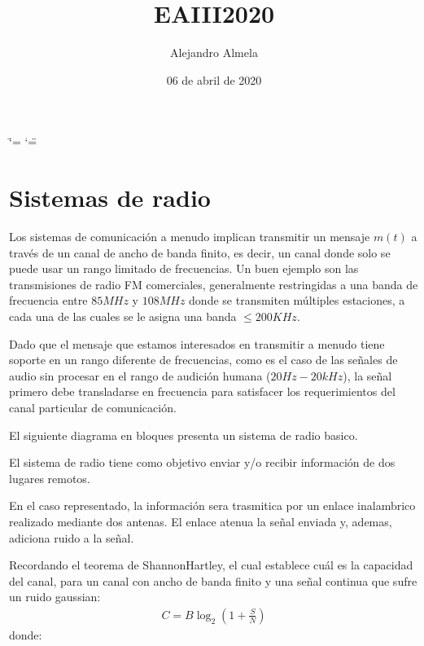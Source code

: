 \documentclass[letterpaper,10pt,spanish]{sphinxmanual}
\title{EAIII2020}
\date{06 de abril de 2020}
\author{Alejandro Almela}
\let\sphinxpxdimen\pdfpxdimen\else\newdimen\sphinxpxdimen
\begin{document}
\ifdefined\shorthandoff
  \ifnum\catcode`\=\string=\active\shorthandoff{=}\fi
  \ifnum\catcode`\"=\active{}\fi
\fi

\pagestyle{empty}
\sphinxmaketitle
\pagestyle{plain}
\sphinxtableofcontents
\pagestyle{normal}
\label{\detokenize{index::doc}}



\chapter{Sistemas de radio}
\label{\detokenize{introduccion/sistemas:Sistemas-de-radio}}\label{\detokenize{introduccion/sistemas::doc}}
Los sistemas de comunicación a menudo implican transmitir un mensaje \(m(t)\) a través de un canal de ancho de banda finito, es decir, un canal donde solo se puede usar un rango limitado de frecuencias. Un buen ejemplo son las transmisiones de radio FM comerciales, generalmente restringidas a una banda de frecuencia entre \(85MHz\) y \(108MHz\) donde se transmiten múltiples estaciones, a cada una de las cuales se le asigna una banda \(\le 200 KHz\).

Dado que el mensaje que estamos interesados en transmitir a menudo tiene soporte en un rango diferente de frecuencias, como es el caso de las señales de audio sin procesar en el rango de audición humana (\(20 Hz - 20 kHz\)), la señal primero debe transladarse en frecuencia para satisfacer los requerimientos del canal particular de comunicación.

El siguiente diagrama en bloques presenta un sistema de radio basico.

\sphinxincludegraphics[width=731\sphinxpxdimen,height=276\sphinxpxdimen]{{radio1}.png}

El sistema de radio tiene como objetivo enviar y/o recibir información de dos lugares remotos.

En el caso representado, la información sera trasmitica por un enlace inalambrico realizado mediante dos antenas. El enlace atenua la señal enviada y, ademas, adiciona ruido a la señal.

Recordando el teorema de Shannon\sphinxhyphen{}Hartley, el cual establece cuál es la capacidad del canal, para un canal con ancho de banda finito y una señal continua que sufre un ruido gaussian:
\begin{equation*}
\begin{split}C=B\log _{2}\left(1+{\frac {S}{N}}\right)\end{split}
\end{equation*}
donde:
\end{document}
